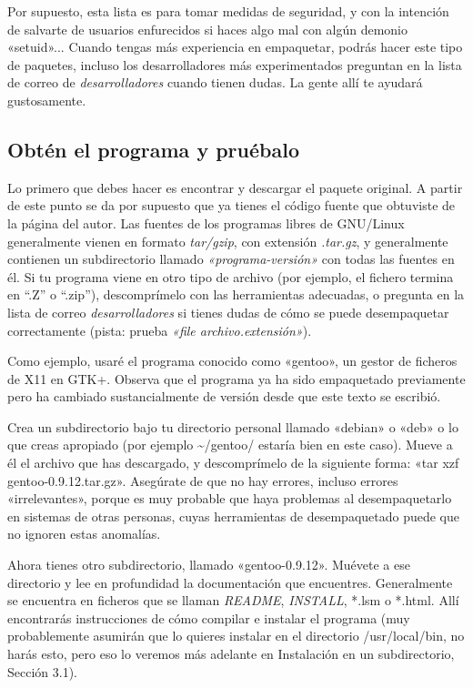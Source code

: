 \documentclass[letterpaper,12pt,spanish]{manual}
\begin{document}
Por supuesto, esta lista es para tomar medidas de seguridad, y con la intención de salvarte de usuarios enfurecidos si haces algo mal con algún demonio «setuid»... Cuando tengas más experiencia en empaquetar, podrás hacer este tipo de paquetes, incluso los desarrolladores más experimentados preguntan en la lista de correo de \emph{desarrolladores} cuando tienen dudas. La gente allí te ayudará gustosamente.


\subsection{Obtén el programa y pruébalo}

Lo primero que debes hacer es encontrar y descargar el paquete original. A partir de este punto se da por supuesto que ya tienes el código fuente que obtuviste de la página del autor. Las fuentes de los programas libres de GNU/Linux generalmente vienen en formato \emph{tar/gzip}, con extensión \emph{.tar.gz}, y generalmente contienen un subdirectorio llamado \emph{«programa-versión»} con todas las fuentes en él. Si tu programa viene en otro tipo de archivo (por ejemplo, el fichero termina en ``.Z'' o ``.zip''), descomprímelo con las herramientas adecuadas, o pregunta en la lista de correo \emph{desarrolladores} si tienes dudas de cómo se puede desempaquetar correctamente (pista: prueba \emph{«file archivo.extensión»}).

Como ejemplo, usaré el programa conocido como «gentoo», un gestor de ficheros de X11 en GTK+. Observa que el programa ya ha sido empaquetado previamente pero ha cambiado sustancialmente de versión desde que este texto se escribió.

Crea un subdirectorio bajo tu directorio personal llamado «debian» o «deb» o lo que creas apropiado (por ejemplo \textasciitilde{}/gentoo/ estaría bien en este caso). Mueve a él el archivo que has descargado, y descomprímelo de la siguiente forma: «tar xzf gentoo-0.9.12.tar.gz». Asegúrate de que no hay errores, incluso errores «irrelevantes», porque es muy probable que haya problemas al desempaquetarlo en sistemas de otras personas, cuyas herramientas de desempaquetado puede que no ignoren estas anomalías.

Ahora tienes otro subdirectorio, llamado «gentoo-0.9.12». Muévete a ese directorio y lee en profundidad la documentación que encuentres. Generalmente se encuentra en ficheros que se llaman \emph{README}, \emph{INSTALL}, *.lsm o *.html. Allí encontrarás instrucciones de cómo compilar e instalar el programa (muy probablemente asumirán que lo quieres instalar en el directorio /usr/local/bin, no harás esto, pero eso lo veremos más adelante en Instalación en un subdirectorio, Sección 3.1).
\end{document}
